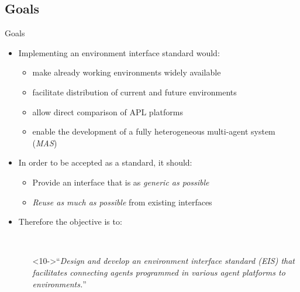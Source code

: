 \documentclass[t]{beamer}
\begin{document}
\subsection{Goals}
\begin{frame}{Goals}
	\begin{itemize}[<+->]
		\item Implementing an environment interface standard would:\nolinebreak\begin{itemize}
			\item make already working environments widely available
			\item facilitate distribution of current and future environments
			\item allow direct comparison of APL platforms
			\item enable the development of a fully heterogeneous multi-agent system (\emph{MAS})
		\end{itemize}
		\item In order to be accepted as a standard, it should:
		\begin{itemize}
			\item Provide an interface that is as \textit{generic as possible}
			\item \textit{Reuse as much as possible} from existing interfaces
		\end{itemize}
		\item Therefore the objective is to: 
		\begin{itemize}
			\item[] \ 
			\item[]<10->``\textit{Design and develop an environment interface standard (\emph{EIS}) that facilitates connecting agents programmed in various agent platforms to environments.}''
		\end{itemize}
	\end{itemize}
\end{frame}
\end{document}
